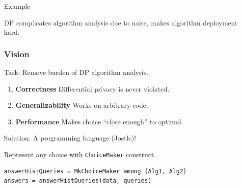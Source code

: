 \documentclass{beamer}
\begin{document}
\begin{frame}{Example}
\begin{center}
\end{center}
DP complicates algorithm analysis due to noise, makes algorithm deployment hard.
\end{frame}
\begin{frame}[fragile]\frametitle{Vision}
Task: Remove burden of DP algorithm analysis.
\begin{enumerate}
\item \textbf{Correctness} Differential privacy is never violated. 
\item \textbf{Generalizability} Works on arbitrary code.
\item \textbf{Performance} Makes choice ``close enough'' to optimal.
\end{enumerate}
Solution: A programming language (Jostle)!

Represent any choice with \texttt{ChoiceMaker} construct.
\begin{lstlisting}[style=MyPythonStyle]
answerHistQueries = MkChoiceMaker among {Alg1, Alg2}
answers = answerHistQueries(data, queries)
\end{lstlisting}
\end{frame}
\end{document}
